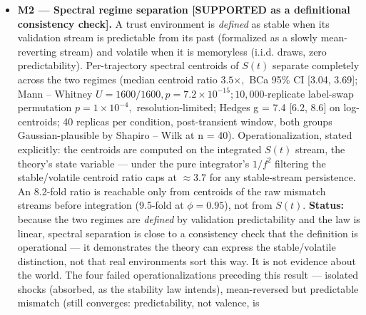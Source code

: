 \documentclass[
]{article}
\begin{document}
\begin{itemize}
  Figure SR5. The trust manifold rendered (Sim G6-M1, independent
  re-implementation of the published specification; seed 20260908). (a)
  3-D PCA embedding of the centered simplex {Δ4} (81.8\% of trajectory
  variance): 60 stage-mix trajectories (light {→} dark with time; orange
  markers: initial conditions; red arrows: flow direction) contract
  radially onto the alignment attractor T* (gold star) --- exactly
  radial under the linear law, uniform contraction made visible; the
  faint wireframe is the projected simplex frame. (b) Distance decay
  (Hellinger chord, the convention of the printed G6-M1 values): every
  trajectory enters the {d \textless{} 0.05} convergence band.
  Interactive version, code, and results JSON in the deposit
  (figures/gtt/, sim-code/, numbers/).
\item
  \textbf{M2 --- Spectral regime separation {[}SUPPORTED as a
  definitional consistency check{]}.} A trust environment is
  \emph{defined} as stable when its validation stream is predictable
  from its past (formalized as a slowly mean-reverting stream) and
  volatile when it is memoryless (i.i.d. draws, zero predictability).
  Per-trajectory spectral centroids of \(S(t)\) separate completely
  across the two regimes (median centroid ratio \(3.5\times,\) BCa 95\%
  CI {[}3.04, 3.69{]}; Mann -- Whitney
  \(U = 1600/1600, p = 7.2 \times 10^{-15}; 10,000\)-replicate
  label-swap permutation \(p = 1 \times 10^{-4},\) resolution-limited;
  Hedges g = 7.4 {[}6.2, 8.6{]} on log-centroids; 40 replicas per
  condition, post-transient window, both groups Gaussian-plausible by
  Shapiro -- Wilk at n = 40). Operationalization, stated explicitly: the
  centroids are computed on the integrated \(S(t)\) stream, the theory's
  state variable --- under the pure integrator's \(1/f^{2}\) filtering
  the stable/volatile centroid ratio caps at \(\approx 3.7\) for any
  stable-stream persistence. An 8.2-fold ratio is reachable only from
  centroids of the raw mismatch streams before integration (9.5-fold at
  \(\phi = 0.95\)), not from \(S(t).\) \textbf{Status:} because the two
  regimes are \emph{defined} by validation predictability and the law is
  linear, spectral separation is close to a consistency check that the
  definition is operational --- it demonstrates the theory can express
  the stable/volatile distinction, not that real environments sort this
  way. It is not evidence about the world. The four failed
  operationalizations preceding this result --- isolated shocks
  (absorbed, as the stability law intends), mean-reversed but
  predictable mismatch (still converges: predictability, not valence, is

\end{itemize}
\end{document}
